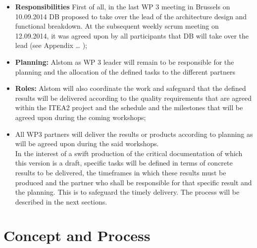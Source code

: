 \begin{itemize}
\item\textbf{Responsibilities} First of all, in the last WP 3 meeting in Brussels on  10.09.2014 DB proposed to take over the lead of the architecture design and functional breakdown. At the subsequent weekly scrum meeting on 12.09.2014,  it was agreed upon by all participants that DB will take over the lead (see Appendix … );\\
\item\textbf{Planning:} Alstom as WP 3 leader will remain to be responsible for the planning and the allocation of the defined tasks to the different partners\\
\item\textbf{Roles:} Alstom will also coordinate the work and safeguard that the defined results will be delivered according to the quality requirements that are agreed within the ITEA2 project and the schedule and the milestones that will be agreed upon during the coming workshops;\\
\item All WP3 partners will deliver the results or products according to planning as will be agreed upon during the said workshops. \\

In the interest of a swift production of the critical documentation of which this version is a draft, specific tasks will be defined in terms of concrete results to be delivered, the timeframes in which these results must be produced and the partner who shall be responsible for that specific result and the planning. This is to safeguard the timely delivery. The process will be described in the next sections.\\
\end{itemize}

\section{Concept and Process}





